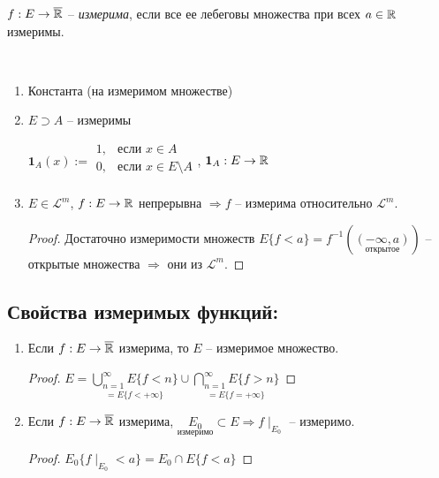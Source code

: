 \begin{definition}
    $f:E\rightarrow \overline{\mathbb{R}}$ – \textit{измерима}, если все ее лебеговы множества 
    при всех $a\in \mathbb{R}$ измеримы.
\end{definition}

\begin{example}~
    \begin{enumerate}
        \item Константа (на измеримом множестве)
        
        \item $E\supset A$ – измеримы
        
        $\mathbf{1}_A(x):= \begin{array}{ll}
            1, & \text{если } x\in A \\
            0, & \text{если } x\in E \setminus A \\ 
        \end{array}$, $\mathbf{1}_A :E \rightarrow \mathbb{R}$

        \item $E\in \mathcal{L}^m$, $f:E\rightarrow \mathbb{R}$ непрерывна $\Rightarrow f$ – 
        измерима относительно $\mathcal{L}^m$.

        \begin{proof}
            Достаточно измеримости множеств $E\{f<a\}=f^{-1}(\underset{\text{открытое}}{(-\infty, a)})$ – открытые 
            множества $\Rightarrow$ они из  $\mathcal{L}^m$.
        \end{proof}
    \end{enumerate}
\end{example}

\subsection*{Свойства измеримых функций:}

\begin{enumerate}
    \item Если $f:E\rightarrow \overline{\mathbb{R}}$ измерима, то $E$ – измеримое множество.
    
    \begin{proof}
        $E=\underset{=E\{f<+\infty\}}{\bigcup\limits_{n=1}^\infty E\{f < n\}}\cup \underset{=E\{f=+\infty\}}{\bigcap\limits_{n=1}^\infty E\{f > n\}}$
    \end{proof}

    \item Если $f:E\rightarrow \overline{\mathbb{R}}$ измерима, $\underset{\text{измеримо}}{E_0}\subset E\Rightarrow f\mid_{E_0}$
    – измеримо.

    \begin{proof}
        $E_0\{f\mid_{E_0}< a\}=E_0\cap E\{f < a\}$
    \end{proof}
\end{enumerate}